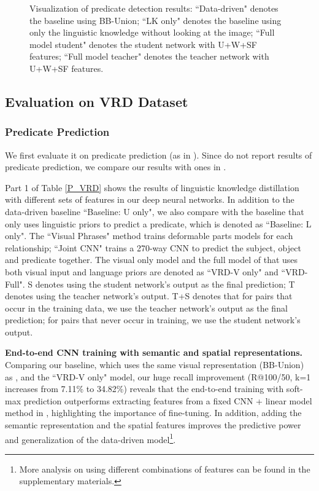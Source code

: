 \begin{figure*}[t]
\centering     {}

\caption{Visualization of predicate detection results: ``Data-driven" denotes the baseline using BB-Union; ``LK only" denotes the baseline using only the linguistic knowledge without looking at the image; ``Full model student" denotes the student network with U+W+SF features; ``Full model teacher" denotes the teacher network with U+W+SF features.}
\end{figure*}

\subsection{Evaluation on VRD Dataset}
\subsubsection{Predicate Prediction}
We first evaluate it on predicate prediction (as in \cite{VRD}).
Since \cite{UIUC,VIPCNN,RL} do not report results of predicate prediction, we compare our results with ones in \cite{VRD, VisualPhrase}. 

Part 1 of Table \ref{P_VRD} shows the results of linguistic knowledge distillation with different sets of features in our deep neural networks. In addition to the data-driven baseline ``Baseline: U only", we also compare with the baseline that only uses linguistic priors to predict a predicate, which is denoted as ``Baseline: L only". The ``Visual Phrases" method \cite{VisualPhrase} trains deformable parts models for each relationship; ``Joint CNN" \cite{Rcnn} trains a 270-way CNN to predict the subject, object and predicate together. The visual only model and the full model of \cite{VRD} that uses both visual input and language priors are denoted as ``VRD-V only" and ``VRD-Full". S denotes using the student network's output as the final prediction; T denotes using the teacher network's output. T+S denotes that for  pairs that occur in the training data, we use the teacher network's output as the final prediction; for  pairs that never occur in training, we use the student network's output. 

\textbf{End-to-end CNN training with semantic and spatial representations.} Comparing our baseline, which uses the same visual representation (BB-Union) as \cite{VRD}, and the ``VRD-V only" model, our huge recall improvement (R@100/50, k=1 increases from 7.11\% \cite{VRD} to 34.82\%) reveals that the end-to-end training with soft-max prediction outperforms extracting features from a fixed CNN + linear model method in \cite{VRD}, highlighting the importance of fine-tuning. In addition, adding the semantic representation and the spatial features improves the predictive power and generalization of the data-driven model\footnote{More analysis on using different combinations of features can be found in the supplementary materials.}.






